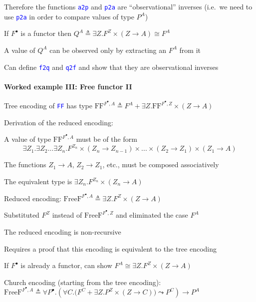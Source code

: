 Therefore the functions \texttt{\textcolor{blue}{\footnotesize{}a2p}}
and \texttt{\textcolor{blue}{\footnotesize{}p2a}} are \textsf{``}observational\textsf{''}
inverses (i.e.~we need to use \texttt{\textcolor{blue}{\footnotesize{}p2a}}
in order to compare values of type $P^{A}$)

If $F^{\bullet}$ is a functor then $Q^{A}\triangleq\exists Z.F^{Z}\times\left(Z\rightarrow A\right)\cong F^{A}$

A value of $Q^{A}$ can be observed only by extracting an $F^{A}$
from it

Can define \texttt{\textcolor{blue}{\footnotesize{}f2q}} and \texttt{\textcolor{blue}{\footnotesize{}q2f}}
and show that they are observational inverses


\paragraph{Worked example III: Free functor II}

Tree encoding of \texttt{\textcolor{blue}{\footnotesize{}FF}} has
type $\text{FF}^{F^{\bullet},A}\triangleq F^{A}+\exists Z.\text{FF}^{F^{\bullet},Z}\times\left(Z\rightarrow A\right)$

Derivation of the reduced encoding:

A value of type $\text{FF}^{F^{\bullet},A}$ must be of the form {\footnotesize{}
\[
\exists Z_{1}.\exists Z_{2}...\exists Z_{n}.F^{Z_{n}}\times\left(Z_{n}\rightarrow Z_{n-1}\right)\times...\times\left(Z_{2}\rightarrow Z_{1}\right)\times\left(Z_{1}\rightarrow A\right)
\]
}{\footnotesize\par}

The functions $Z_{1}\rightarrow A$, $Z_{2}\rightarrow Z_{1}$, etc.,
must be composed associatively

The equivalent type is $\exists Z_{n}.F^{Z_{n}}\times\left(Z_{n}\rightarrow A\right)$

Reduced encoding: $\text{FreeF}^{F^{\bullet},A}\triangleq\exists Z.F^{Z}\times\left(Z\rightarrow A\right)$

Substituted $F^{Z}$ instead of $\text{FreeF}^{F^{\bullet},Z}$ and
eliminated the case $F^{A}$

The reduced encoding is non-recursive

Requires a proof that this encoding is equivalent to the tree encoding

If $F^{\bullet}$ is already a functor, can show $F^{A}\cong\exists Z.F^{Z}\times\left(Z\rightarrow A\right)$

Church encoding (starting from the tree encoding): $\text{FreeF}^{F^{\bullet},A}\triangleq\forall P^{\bullet}.\left(\forall C.\big(F^{C}+\exists Z.P^{Z}\times\left(Z\rightarrow C\right)\big)\leadsto P^{C}\right)\rightarrow P^{A}$

